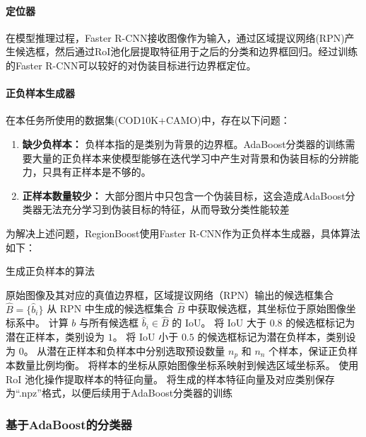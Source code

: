 \documentclass[a4paper,12pt]{ctexart}
\begin{document}
\paragraph{定位器}
在模型推理过程，Faster R-CNN接收图像作为输入，通过区域提议网络(RPN)产生候选框，然后通过RoI池化层提取特征用于之后的分类和边界框回归。经过训练的Faster R-CNN可以较好的对伪装目标进行边界框定位。

\paragraph{正负样本生成器}
在本任务所使用的数据集(COD10K+CAMO)中，存在以下问题：
\begin{enumerate}
    \item \textbf{缺少负样本：} 负样本指的是类别为背景的边界框。AdaBoost分类器的训练需要大量的正负样本来使模型能够在迭代学习中产生对背景和伪装目标的分辨能力，只具有正样本是不够的。
    \item \textbf{正样本数量较少：} 大部分图片中只包含一个伪装目标，这会造成AdaBoost分类器无法充分学习到伪装目标的特征，从而导致分类性能较差
\end{enumerate}
为解决上述问题，RegionBoost使用Faster R-CNN作为正负样本生成器，具体算法如下：

\begin{algorithm}[H]
    \caption{生成正负样本的算法}
    \label{alg:sample_generation}
    \begin{algorithmic}[1]
        \REQUIRE 原始图像及其对应的真值边界框，区域提议网络（RPN）输出的候选框集合 $\hat{B} = \{\hat{b}_{i}\}$
        \STATE 从 RPN 中生成的候选框集合 $\hat{B}$ 中获取候选框，其坐标位于原始图像坐标系中。
            \STATE 计算 $b$ 与所有候选框 $\hat{b}_{i} \in \hat{B}$ 的 IoU。
            \STATE 将 IoU 大于 $0.8$ 的候选框标记为潜在正样本，类别设为 $1$。
            \STATE 将 IoU 小于 $0.5$ 的候选框标记为潜在负样本，类别设为 $0$。
        \ENDFOR
        \STATE 从潜在正样本和负样本中分别选取预设数量 $n_p$ 和 $n_n$ 个样本，保证正负样本数量比例均衡。
            \STATE 将样本的坐标从原始图像坐标系映射到候选区域坐标系。
            \STATE 使用 RoI 池化操作提取样本的特征向量。
        \ENDFOR
        \STATE 将生成的样本特征向量及对应类别保存为“.npz”格式，以便后续用于AdaBoost分类器的训练
    \end{algorithmic}
\end{algorithm}

\subsubsection{基于AdaBoost的分类器}
\end{document}
